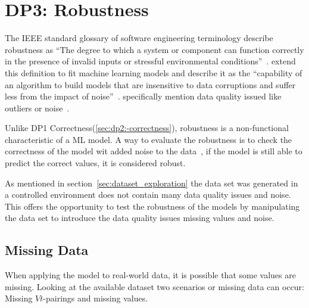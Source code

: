 \section{DP3: Robustness}\label{sec:robustness}



The IEEE standard glossary of software engineering terminology describe
robustness as ``The degree
to which a system or component can function correctly in the presence of
invalid inputs or
stressful environmental conditions''~\cite[p. 64]{terminology1990ieee}.
\cite{saez2016evaluating} extend this definition to fit machine learning
models and describe it
as the ``capability of an algorithm to build models that are insensitive to
data corruptions and
suffer less from the impact of noise''~\cite[p.
2]{saez_evaluatingclassifierbehavior_2016}.
\cite{siebert2022construction} specifically mention data quality issued like
outliers or
noise~\cite[p. 16]{siebert2022construction}.

Unlike DP1 Correctness(\ref{sec:dp2:-correctness}), robustness is a
non-functional characteristic
of a \ac{ML} model.
A way to evaluate the robustness is to check the correctness of the model wit
added noise to the data~\cite[p. 18]{zhou_machinelearning_2021}, if the model
is still able to
predict the correct values, it is considered robust.

As mentioned in section~\ref{sec:dataset_exploration} the data set
was generated in a controlled environment does not contain many data quality
issues and noise.
This offers the opportunity to test the robustness of the models by
manipulating the data set
to introduce the data quality issues missing values and noise.

\subsection{Missing Data}\label{subsec:missing-data}
When applying the model to real-world data, it is possible that some values
are missing.
Looking at the available dataset two scenarios or missing data can occur:
Missing $Vt$-pairings
and missing values.

